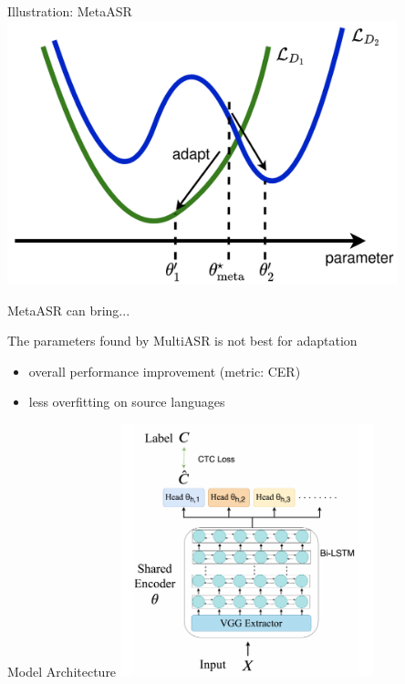 \documentclass{beamer}
\begin{document}
\begin{frame}[t]{Illustration: MetaASR}
  \center \includegraphics[width=0.85\textwidth]{fig/meta_illustration.png} 
\end{frame}

\begin{frame}[t]{MetaASR can bring...}
  \begin{center}
  The parameters found by MultiASR is not best for adaptation
  \end{center}

  \begin{itemize}
    \item overall performance improvement (metric: CER)
    \item less overfitting on source languages
  \end{itemize}
  \flushright \hyperlink{another example}{}
\end{frame}


\begin{frame}[t]{Model Architecture}
  \center \includegraphics[width=0.55\textwidth]{fig/model_arch.png}
\end{frame}
\end{document}
